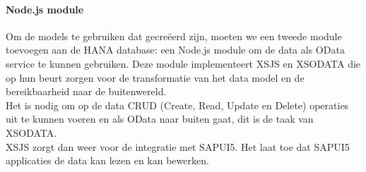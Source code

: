             \paragraph{Node.js module}
            Om de models te gebruiken dat gecreëerd zijn, moeten we een tweede module toevoegen aan de HANA database: een Node.js module om de data als OData service te kunnen gebruiken.
            Deze module implementeert XSJS en XSODATA die op hun beurt zorgen voor de transformatie van het data model en de bereikbaarheid naar de buitenwereld.\\
            Het is nodig om op de data CRUD (Create, Read, Update en Delete) operaties uit te kunnen voeren en als OData naar buiten gaat, dit is de taak van XSODATA.\\
            XSJS zorgt dan weer voor de integratie met SAPUI5. Het laat toe dat SAPUI5 applicaties de data kan lezen en kan bewerken.
